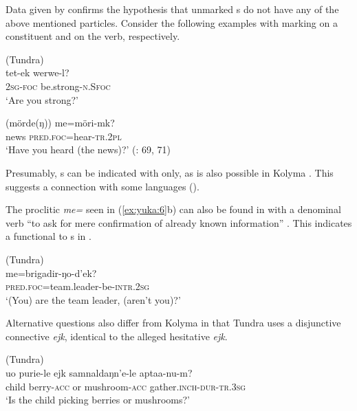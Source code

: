 Data given by \citet{Schmalz2012} confirms the hypothesis that unmarked s do not have any of the above mentioned particles. Consider the following examples with  marking on a constituent and on the verb, respectively.

\ea%
    \label{ex:yuka:6}
     (Tundra)\\
    \ea
    \gll tet-{ek} werwe-l?\\
    2\textsc{sg}-\textsc{foc}  be.strong-\textsc{n.}S\textsc{foc}\\
    \glt ‘Are you strong?’
    
    \ex
    \gll (mörde(ŋ)) me=möri-mk?\\
    news \textsc{pred.foc}=hear-\textsc{tr}.2\textsc{pl}\\
    \glt ‘Have you heard (the news)?’ (\citealt{Schmalz2012}: 69, 71)
    \z
    \z

Presumably, s can be indicated with  only, as is also possible in Kolyma . This suggests a connection with some  languages ().

The proclitic \textit{me=} seen in (\ref{ex:yuka:6}b) can also be found in  with a denominal verb “to ask for mere confirmation of already known information” \citep[88]{Schmalz2012}. This indicates a functional  to s in .

\ea%
    \label{ex:yuka:7}
     (Tundra)\\
    \gll me{=brigadir-ŋo-d’ek?}\\
    \textsc{pred.foc}=team.leader-be-\textsc{intr}.2\textsc{sg}\\
    \glt ‘(You) are the team leader, (aren’t you)?’ \citep[88]{Schmalz2012}
    \z

Alternative questions also differ from Kolyma  in that Tundra  uses a disjunctive connective \textit{ejk}, identical to the alleged hesitative \textit{ejk}.

\ea%
    \label{ex:yuka:8}
     (Tundra)\\
    \gll uo  purie-le ejk samnaldaŋn’e-le  aptaa-nu-m?\\
     child  berry-\textsc{acc} or  mushroom-\textsc{acc}  gather.\textsc{inch}-\textsc{dur}-\textsc{tr}.3\textsc{sg}\\
    \glt ‘Is the child picking berries or mushrooms?’ \citep[83]{Schmalz2012}
    \z

